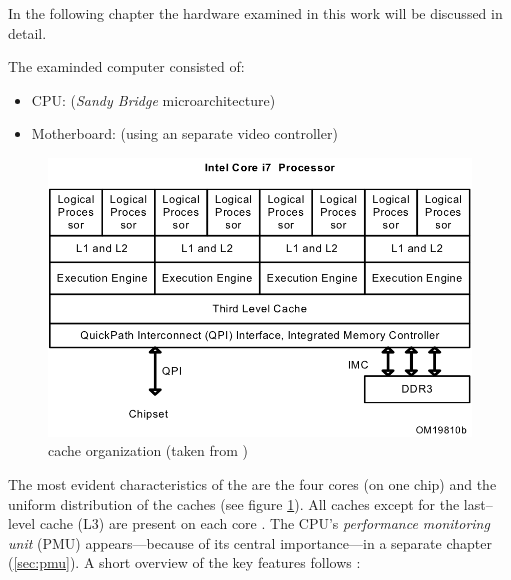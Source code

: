 \label{sec:technical-prerequisites}

In the following chapter the hardware examined in this work will be discussed in
detail.


\label{sec:hw-products}

The examinded computer consisted of:

\begin{itemize}

\item CPU: \JWPLcpu{} (\emph{San\-dy Bridge} microarchitecture)

\item Motherboard: \JWPLboard{} (using an separate video controller)

\end{itemize}


\label{sec:sandy-bridge}

\begin{figure}
  \centering
    \includegraphics[width=\textwidth]{fig/intel-cache-orga.png}
  \caption{\JWPcpu{} cache organization (taken from \cite{intel2011softdev1})}
  \label{fig:cache-orga}
\end{figure}

The most evident characteristics of the \JWPcpu{} are the four cores (on one
chip) and the uniform distribution of the caches (see figure
\ref{fig:cache-orga}). All caches except for the last--level cache (L3) are
present on each core \cite{fog11}. The CPU's \emph{performance monitoring unit}
(PMU) appears---because of its central importance---in a separate chapter
(\ref{sec:pmu}). A short overview of the key features follows
\cite{intel2011spec}:

